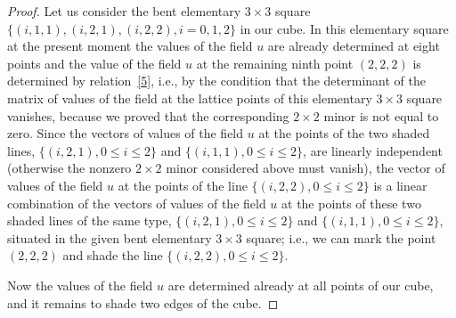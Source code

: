 \begin{proof}
Let us consider the bent elementary $3 \times 3$ square $\{(i, 1,
1), (i, 2, 1), (i, 2, 2), i = 0, 1, 2\}$ in our cube. In this
elementary square at the present moment the values of the f\/ield $u$
are already determined at eight points and the value of the f\/ield
$u$ at the remaining ninth point $(2, 2, 2)$ is determined by
relation~\eqref{5}, i.e., by the condition that the
determinant of the matrix of values of the f\/ield at the lattice
points of this elementary $3 \times 3$ square vanishes, because we
proved that the corresponding $2 \times 2$ minor is not equal to
zero. Since the vectors of values of the f\/ield $u$ at the points of
the two shaded lines, $\{(i, 2, 1), 0 \leq i \leq 2\}$ and $\{(i, 1,
1), 0 \leq i \leq 2\}$, are linearly independent (otherwise the
nonzero $2 \times 2$ minor considered above must vanish), the vector
of values of the f\/ield $u$ at the points of the line $\{(i, 2, 2), 0
\leq i \leq 2\}$ is a linear combination of the vectors of values of
the f\/ield $u$ at the points of these two shaded lines of the same
type, $\{(i, 2, 1), 0 \leq i \leq 2\}$ and $\{(i, 1, 1), 0 \leq i
\leq 2\}$, situated in the given bent elementary $3 \times 3$
square; i.e., we can mark the point $(2, 2, 2)$ and shade the line
$\{(i, 2, 2), 0 \leq i \leq 2\}$.


Now the values of the f\/ield $u$ are determined already at all points
of our cube, and it remains to shade two edges of the cube.



\end{proof}
